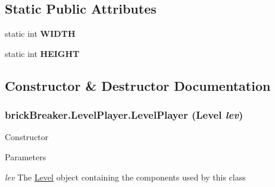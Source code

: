 \subsection*{Static Public Attributes}
\begin{DoxyCompactItemize}
\item 
\hypertarget{classbrick_breaker_1_1_level_player_a0fabd8254a778679106f0817ec18d4d8}{
static int {\bfseries WIDTH}}
\label{classbrick_breaker_1_1_level_player_a0fabd8254a778679106f0817ec18d4d8}

\item 
\hypertarget{classbrick_breaker_1_1_level_player_a78ba1a2042a37d401a70998c49030b7c}{
static int {\bfseries HEIGHT}}
\label{classbrick_breaker_1_1_level_player_a78ba1a2042a37d401a70998c49030b7c}

\end{DoxyCompactItemize}


\subsection{Constructor \& Destructor Documentation}
\hypertarget{classbrick_breaker_1_1_level_player_a34f8b2db5684239038d4b5f33d7c93f6}{
\subsubsection[{LevelPlayer}]{\setlength{\rightskip}{0pt plus 5cm}brickBreaker.LevelPlayer.LevelPlayer ({\bf Level} {\em lev})}}
\label{classbrick_breaker_1_1_level_player_a34f8b2db5684239038d4b5f33d7c93f6}
Constructor 
\begin{DoxyParams}{Parameters}
\item[{\em lev}]The \hyperlink{classbrick_breaker_1_1_level}{Level} object containing the components used by this class \end{DoxyParams}


